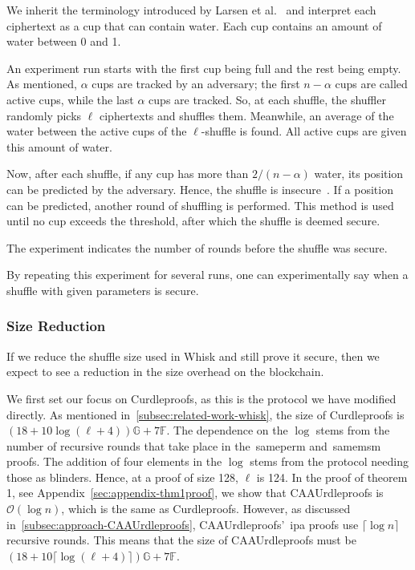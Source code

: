 We inherit the terminology introduced by Larsen et al.~\cite{cryptoeprint:2022/560} and interpret each ciphertext as a cup that can contain water.
Each cup contains an amount of water between 0 and 1.

An experiment run starts with the first cup being full and the rest being empty.
As mentioned, $\alpha$ cups are tracked by an adversary; the first $n-\alpha$ cups are called active cups, while the last $\alpha$ cups are tracked.
So, at each shuffle, the shuffler randomly picks $\ell$ ciphertexts and shuffles them.
Meanwhile, an average of the water between the active cups of the $\ell$-shuffle is found.
All active cups are given this amount of water.

Now, after each shuffle, if any cup has more than $2/(n-\alpha)$ water, its position can be predicted by the adversary.
Hence, the shuffle is insecure~\cite{cryptoeprint:2022/560}.
If a position can be predicted, another round of shuffling is performed.
This method is used until no cup exceeds the threshold, after which the shuffle is deemed secure.

The experiment indicates the number of rounds before the shuffle was secure.

By repeating this experiment for several runs, one can experimentally say when a shuffle with given parameters is secure.

\subsubsection{Size Reduction}
If we reduce the shuffle size used in Whisk and still prove it secure, then we expect to see a reduction in the size overhead on the blockchain.

We first set our focus on Curdleproofs, as this is the protocol we have modified directly.
As mentioned in~\autoref{subsec:related-work-whisk}, the size of Curdleproofs is $(18+10 \log(\ell+4))\mathbb{G}+7\mathbb{F}$.
The dependence on the $\log$ stems from the number of recursive rounds that take place in the~\gls{sameperm} and~\gls{samemsm} proofs.
The addition of four elements in the $\log$ stems from the protocol needing those as blinders.
Hence, at a proof of size 128, $\ell$ is 124.
In the proof of theorem 1, see Appendix~\ref{sec:appendix-thm1proof}, we show that CAAUrdleproofs is $\mathcal{O}(\log n)$, which is the same as Curdleproofs.
However, as discussed in~\autoref{subsec:approach-CAAUrdleproofs}, CAAUrdleproofs'~\gls{ipa} proofs use $\lceil \log n \rceil$ recursive rounds.
This means that the size of CAAUrdleproofs must be $(18+10 \lceil\log(\ell+4)\rceil)\mathbb{G}+7\mathbb{F}$.

